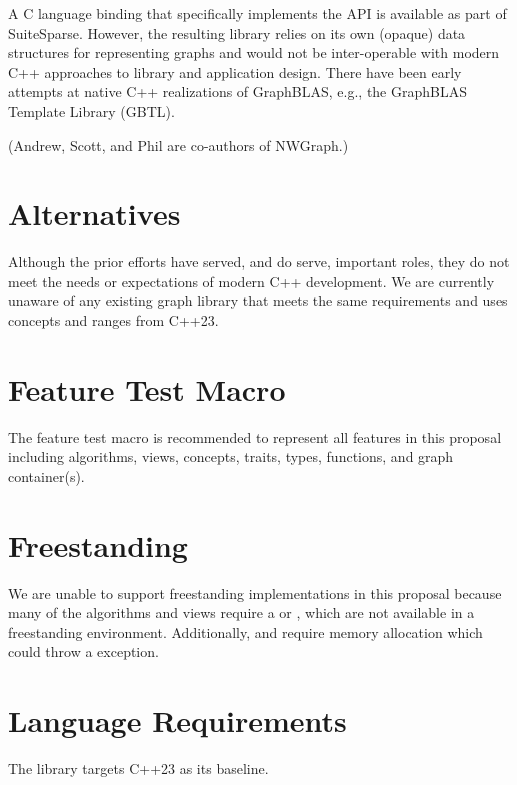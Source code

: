 A C language binding that specifically implements the API is available as part of SuiteSparse.
However, the resulting library relies on its own (opaque) data structures for representing graphs
and would not be inter-operable with modern C++ approaches to library and application design.
There have been early attempts at native C++ realizations of GraphBLAS, e.g., the
GraphBLAS Template Library (GBTL).

(Andrew, Scott, and Phil are co-authors of NWGraph.)



\section{Alternatives}
Although the prior efforts have served, and do serve, important roles,
they do not meet the needs or expectations of modern C++ development.
We are currently
unaware of any existing graph
library that meets the same requirements and uses concepts and ranges from C++23.



\section{Feature Test Macro}
The  feature test macro is recommended to represent all features in this proposal including algorithms, views, concepts, traits, types, functions, and graph container(s).

\section{Freestanding}
We are unable to support freestanding implementations in this proposal because many of the algorithms and views 
require a  or , which are not available in a freestanding environment. 
Additionally,  and  require memory allocation which could throw a  
exception.

\section{Language Requirements}
The library targets C++23 as its baseline.


